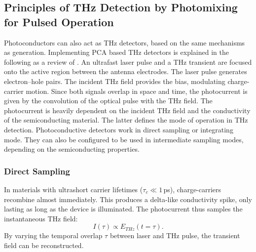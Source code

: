 \subsection{Principles of THz Detection by Photomixing for Pulsed Operation}

Photoconductors can also act as THz detectors, based on the same mechanisms as generation. Implementing PCA based THz detectors is explained in the following as a review of \cite{preuPrinciplesTHzGeneration2015,castro-camusPhotoconductiveResponseCorrection2008}. An ultrafast laser pulse and a THz transient are focused onto the active region between the antenna electrodes. The laser pulse generates electron–hole pairs. The incident THz field provides the bias, modulating charge-carrier motion. Since both signals overlap in space and time, the photocurrent is given by the convolution of the optical pulse with the THz field. The photocurrent is heavily dependent on the incident THz field and the conductivity of the semiconducting material. The latter defines the mode of operation in THz detection. Photoconductive detectors work in direct sampling or integrating mode. They can also be configured to be used in intermediate sampling modes, depending on the semiconducting properties.


\subsubsection{Direct Sampling}

In materials with ultrashort carrier lifetimes ($\tau_c \ll 1$\,\si{\pico \s}), charge-carriers recombine almost immediately. This produces a delta-like conductivity spike, only lasting as long as the device is illuminated. The photocurrent thus samples the instantaneous THz field:
\begin{equation}
    I(\tau) \propto E_{THz}(t=\tau).
\end{equation}
By varying the temporal overlap $\tau$ between laser and THz pulse, the transient field can be reconstructed.

